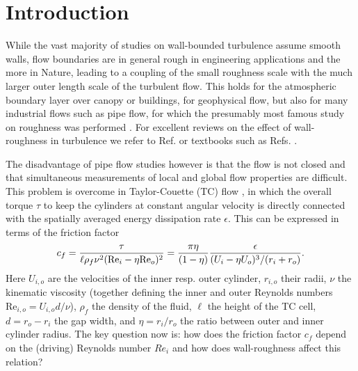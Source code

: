 \documentclass[aps,prl,superscriptaddress,preprint]{revtex4}
\def\be{\begin{equation}}
\def\ee{\end{equation}}
\begin{document}
\section{Introduction} 

While the vast majority of studies on wall-bounded turbulence assume smooth walls, flow boundaries are in general rough in engineering applications and the more in Nature, leading to a coupling of the small roughness scale with the much larger outer length scale of the turbulent flow. This holds for the atmospheric boundary layer over canopy or buildings, for geophysical flow, but also for many industrial flows such as pipe flow, for which the presumably most famous study on roughness was performed \cite{nik33}. For excellent reviews on the effect of wall-roughness in turbulence we refer to Ref. \cite{jim04} or textbooks such as Refs. \cite{pop00,sch00}.

The disadvantage of pipe flow studies however is that the flow is not closed and that simultaneous measurements
of local and global flow properties are difficult. This problem is overcome in Taylor-Couette (TC) flow \cite{gro16},
in which the overall torque $\tau$ to keep the cylinders at constant angular velocity is directly connected with the 
spatially averaged energy dissipation rate $\epsilon$. 
This can be expressed in terms of the friction factor 
\be
c_f = {\tau\over  \ell \rho_f \nu^2 (\mathrm{Re}_i-\eta \mathrm{Re}_o)^2}= {\pi \eta \over (1-\eta)}    {\epsilon\over (U_i-\eta U_o)^3/(r_i+r_o) } . 
\label{tau-eps}
\ee
Here
$U_{i,o}$ are the velocities of the inner resp. outer 
cylinder, $r_{i,o}$  their radii, $\nu$ the kinematic viscosity (together defining the
inner and outer Reynolds numbers $\mathrm{Re}_{i,o} = U_{i,o} d/\nu$), $\rho_f$ the density of the fluid, $\ell$ the height of the TC cell,
$d=r_o-r_i$ the gap width, 
and $\eta =  r_i/r_o$ the ratio between outer and inner cylinder radius. 
The key question now is: how does the friction factor $c_f$ depend on the (driving) Reynolds number $Re_{i}$ and
how does wall-roughness affect this relation?
\end{document}
